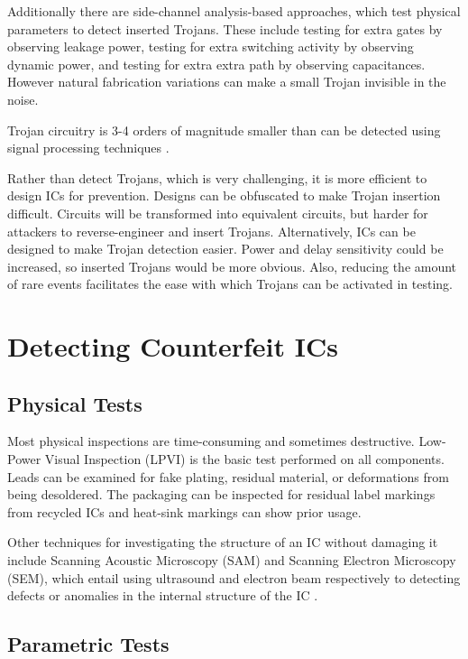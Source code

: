 \documentclass{IEEEtran}
\begin{document}
Additionally there are side-channel analysis-based approaches, which test physical parameters to detect inserted Trojans. These include testing for extra gates by observing leakage power, testing for extra switching activity by observing dynamic power, and testing for extra extra path by observing capacitances. However natural fabrication variations can make a small Trojan invisible in the noise. 

Trojan circuitry is 3-4 orders of magnitude smaller than can be detected  using signal processing techniques \cite{TrojanDetectionUsingICFingerprints}. 

Rather than detect Trojans, which is very challenging, it is more efficient to design ICs for prevention. Designs can be obfuscated to make Trojan insertion difficult. Circuits will be transformed into equivalent circuits, but harder for attackers to reverse-engineer and insert Trojans. Alternatively, ICs can be designed to make Trojan detection easier. Power and delay sensitivity could be increased, so inserted Trojans would be more obvious. Also, reducing the amount of rare events facilitates the ease with which Trojans can be activated in testing.

\section{Detecting Counterfeit ICs}

\subsection{Physical Tests}

Most physical inspections are time-consuming and sometimes destructive. Low-Power Visual Inspection (LPVI) is the basic test performed on all components. Leads can be examined for fake plating, residual material, or deformations from being desoldered. The packaging can be inspected for residual label markings from recycled ICs and heat-sink markings can show prior usage.

Other techniques for investigating the structure of an IC without damaging it include Scanning Acoustic Microscopy (SAM) and Scanning Electron Microscopy (SEM), which entail using ultrasound and electron beam respectively to detecting defects or anomalies in the internal structure of the IC \cite{proceedings}. 


\subsection{Parametric Tests}
\end{document}
